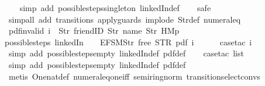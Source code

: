 \begin{isabellebody}
%
\isadelimproof
\ \ %
\endisadelimproof
%
\isatagproof
{}\isamarkupfalse%
\ {\isacharparenleft}simp\ add{\isacharcolon}\ possible{\isacharunderscore}steps{\isacharunderscore}singleton\ linkedIn{\isacharunderscore}def{\isacharparenright}\isanewline
\ \ \isamarkupfalse%
\ safe\isanewline
\ \ \isamarkupfalse%
\ {\isacharparenleft}simp{\isacharunderscore}all\ add{\isacharcolon}\ transitions\ apply{\isacharunderscore}guards\ implode\ Str{\isacharunderscore}def\ numeral{\isacharunderscore}{}{\isacharunderscore}eq{\isacharunderscore}{}{\isacharparenright}%
\endisatagproof
{\isafoldproof}%
%
\isadelimproof
\isanewline
%
\endisadelimproof
\isanewline
{}\isamarkupfalse%
\ pdf{\isacharunderscore}{}{\isacharunderscore}invalid{\isacharcolon}\ {\isachardoublequoteopen}i\ {\isasymnoteq}\ {\isacharbrackleft}Str\ {\isacharprime}{\isacharprime}friendID{\isacharprime}{\isacharprime}{\isacharcomma}\ Str\ {\isacharprime}{\isacharprime}name{\isacharprime}{\isacharprime}{\isacharcomma}\ Str\ {\isacharprime}{\isacharprime}HM{}p{\isacharprime}{\isacharprime}{\isacharbrackright}\ {\isasymLongrightarrow}\isanewline
possible{\isacharunderscore}steps\ linkedIn\ {}\ {\isacharparenleft}{\isacharless}{\isachargreater}{\isacharparenleft}{}\ {\isacharcolon}{\isacharequal}\ EFSM{\isachardot}Str\ {\isacharprime}{\isacharprime}free{\isacharprime}{\isacharprime}{\isacharparenright}{\isacharparenright}\ STR\ {\isacharprime}{\isacharprime}pdf{\isacharprime}{\isacharprime}\ i\ {\isacharequal}\ {\isacharbraceleft}{\isacharbar}{\isacharbar}{\isacharbraceright}{\isachardoublequoteclose}\isanewline
%
\isadelimproof
\ \ %
\endisadelimproof
%
\isatagproof
{}\isamarkupfalse%
\ {\isacharparenleft}case{\isacharunderscore}tac\ i{\isacharparenright}\isanewline
\ \ \ \isamarkupfalse%
\ {\isacharparenleft}simp\ add{\isacharcolon}\ possible{\isacharunderscore}steps{\isacharunderscore}empty\ linkedIn{\isacharunderscore}def\ pdf{\isacharunderscore}def{\isacharparenright}\isanewline
\ \ \isamarkupfalse%
\ {\isacharparenleft}case{\isacharunderscore}tac\ list{\isacharparenright}\isanewline
\ \ \ \isamarkupfalse%
\ {\isacharparenleft}simp\ add{\isacharcolon}\ possible{\isacharunderscore}steps{\isacharunderscore}empty\ linkedIn{\isacharunderscore}def\ pdf{\isacharunderscore}def{\isacharparenright}\isanewline
\ \ \isamarkupfalse%
\ {\isacharparenleft}metis\ One{\isacharunderscore}nat{\isacharunderscore}def\ numeral{\isacharunderscore}eq{\isacharunderscore}one{\isacharunderscore}iff\ semiring{\isacharunderscore}norm{\isacharparenleft}{}{}{\isacharparenright}\ transition{\isachardot}select{\isacharunderscore}convs{\isacharparenleft}{}{\isacharparenright}{\isacharparenright}\isanewline

\end{isabellebody}
